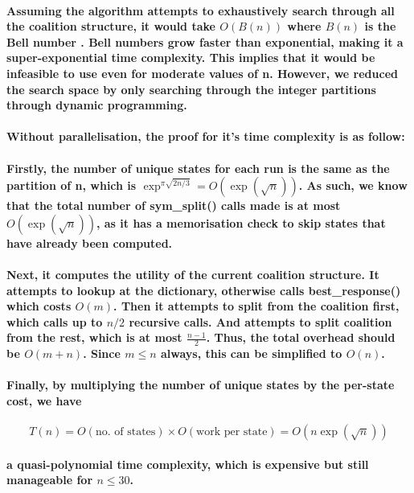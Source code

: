 \documentclass[11pt]{report}
\begin{document}
\paragraph{Assuming the algorithm attempts to exhaustively search through all the coalition structure, it would take $O(B(n))$ where $B(n)$ is the Bell number \cite{bell1934}. Bell numbers grow faster than exponential, making it a super-exponential time complexity. This implies that it would be infeasible to use even for moderate values of n. However, we reduced the search space by only searching through the integer partitions through dynamic programming. }
 
\paragraph{Without parallelisation, the proof for it's time complexity is as follow: }

\paragraph{Firstly, the number of unique states for each run is the same as the partition of n, which is $\exp^{\pi\sqrt{2n/3}}=O(\exp(\sqrt{n}))$\cite{andrews1998partition}. As such, we know that the total number of sym\_split() calls made is at most $O(\exp(\sqrt{n}))$, as it has a memorisation check to skip states that have already been computed. }
\paragraph{Next, it computes the utility of the current coalition structure. It attempts to lookup at the dictionary, otherwise calls best\_response() which costs $O(m)$. Then it attempts to split from the coalition first, which calls up to $n/2$ recursive calls. And attempts to split coalition from the rest, which is at most $\frac{n-1}2$. Thus, the total overhead should be $O(m+n)$. Since $m \leq n$ always, this can be simplified to $O(n)$. }

\paragraph{Finally, by multiplying the number of unique states by the per-state cost, we have }
\[T(n) = O(\text{no. of states}) \times O(\text{work per state}) 
= O(n\exp(\sqrt{n}))
\]

\paragraph{a quasi-polynomial time complexity, which is expensive but still manageable for $n\leq30$. }
\end{document}
